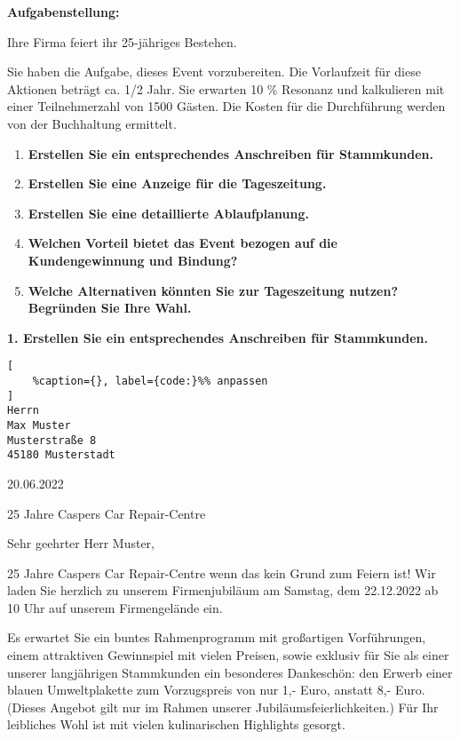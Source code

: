\textbf{Aufgabenstellung:}

Ihre Firma feiert ihr 25-jähriges Bestehen.

Sie haben die Aufgabe, dieses Event vorzubereiten. Die Vorlaufzeit für
diese Aktionen beträgt ca. 1/2 Jahr. Sie erwarten 10 \% Resonanz und
kalkulieren mit einer Teilnehmerzahl von 1500 Gästen. Die Kosten für die
Durchführung werden von der Buchhaltung ermittelt.

\begin{enumerate}
\item
  \textbf{Erstellen Sie ein entsprechendes Anschreiben für Stammkunden.}
\item
  \textbf{Erstellen Sie eine Anzeige für die Tageszeitung.}
\item
  \textbf{Erstellen Sie eine detaillierte Ablaufplanung.}
\item
  \textbf{Welchen Vorteil bietet das Event bezogen auf die
  Kundengewinnung und Bindung?}
\item
  \textbf{Welche Alternativen könnten Sie zur Tageszeitung nutzen?
  Begründen Sie Ihre Wahl.}
\end{enumerate}

\newpage

\textbf{1. Erstellen Sie ein entsprechendes Anschreiben für
Stammkunden.}

\lstset{language=Python}%
\begin{lstlisting}[
	%caption={}, label={code:}%% anpassen
]
Herrn 
Max Muster 
Musterstraße 8 
45180 Musterstadt 
\end{lstlisting}

20.06.2022

25 Jahre Caspers Car Repair-Centre

Sehr geehrter Herr Muster,

25 Jahre Caspers Car Repair-Centre wenn das kein Grund zum Feiern ist!
Wir laden Sie herzlich zu unserem Firmenjubiläum am Samstag, dem
22.12.2022 ab 10 Uhr auf unserem Firmengelände ein.

Es erwartet Sie ein buntes Rahmenprogramm mit großartigen Vorführungen,
einem attraktiven Gewinnspiel mit vielen Preisen, sowie exklusiv für Sie
als einer unserer langjährigen Stammkunden ein besonderes Dankeschön:
den Erwerb einer blauen Umweltplakette zum Vorzugspreis von nur 1,-
Euro, anstatt 8,- Euro. (Dieses Angebot gilt nur im Rahmen unserer
Jubiläumsfeierlichkeiten.) Für Ihr leibliches Wohl ist mit vielen
kulinarischen Highlights gesorgt.

